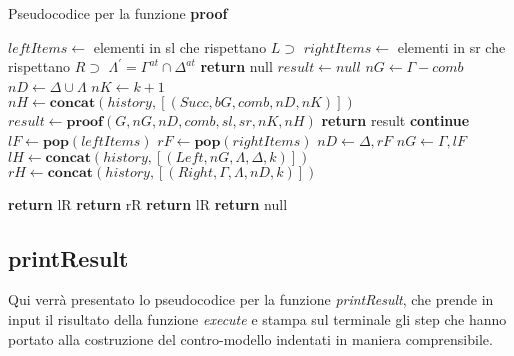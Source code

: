 \documentclass[\main/tesi.tex]{subfiles}
\begin{document}
\begin{algorithm}
    \caption{Pseudocodice per la funzione \textbf{proof}}\label{alg:proof}
    \begin{algorithmic}
        \State $leftItems \gets $ elementi in sl che rispettano $L\supset$
        \State $rightItems \gets $ elementi in sr che rispettano $R\supset$
        \State $\Lambda^{'} = \Gamma^{at} \cap \Delta^{at}$
        \State \textbf{return} null
        \Else
        \State $result \gets null$
        \State $nG \gets \Gamma - comb$
        \State $nD \gets \Delta \cup \Lambda$
        \State $nK \gets k + 1$
        \State $nH \gets \textbf{concat}(history, [(Succ, bG, comb, nD, nK)])$
        \State $result \gets \textbf{proof}(G, nG, nD, comb, sl, sr, nK, nH)$
        \State \textbf{return} result
        \Else
        \State \textbf{continue}
        \EndIf
        \EndFor
        \EndIf
        \Else
        \State $lF \gets \textbf{pop}(leftItems)$
        \State $rF \gets \textbf{pop}(rightItems)$
        \State $nD \gets \Delta, rF$
        \State $nG \gets \Gamma, lF$
        \State $lH \gets \textbf{concat}(history, [(Left, nG, \Lambda, \Delta, k)])$
        \State $rH \gets \textbf{concat}(history, [(Right, \Gamma, \Lambda, nD, k)])$

        \State \textbf{return} lR
        \State \textbf{return} rR
        \State \textbf{return} lR
        \Else
        \State \textbf{return} null
        \EndIf
        \EndIf
        \EndWhile
        \EndFunction
    \end{algorithmic}
\end{algorithm}

\newpage

\subsection{printResult}
Qui verrà presentato lo pseudocodice per la funzione \textit{printResult}, che prende in input il risultato della funzione \textit{execute} e stampa sul terminale gli step che hanno portato alla costruzione del contro-modello indentati in maniera comprensibile. \\
\end{document}
